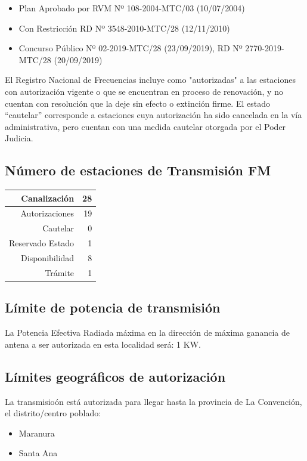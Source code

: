 \documentclass[11pt]{article}
\begin{document}
\begin{itemize}
	\item Plan Aprobado por RVM Nº 108-2004-MTC/03 (10/07/2004)
	\item Con Restricción RD Nº 3548-2010-MTC/28 (12/11/2010)
	\item Concurso Público Nº 02-2019-MTC/28 (23/09/2019), RD Nº 2770-2019-MTC/28 (20/09/2019)
\end{itemize}

El Registro Nacional de Frecuencias incluye como "autorizadas" a las estaciones con autorización vigente o que se encuentran en proceso de renovación, y no cuentan con resolución que la deje sin efecto o extinción firme. El estado “cautelar” corresponde a estaciones cuya autorización ha sido cancelada en la vía administrativa, pero cuentan con una medida cautelar otorgada por el Poder Judicia.

\subsection{Número de estaciones de Transmisión FM}

\begin{tabular}{|r|r|} \hline
	Canalización 			& 28 \\ \hline
	Autorizaciones			& 19 \\ \hline
	Cautelar				& 0 \\ \hline
	Reservado Estado		& 1 \\ \hline
	Disponibilidad			& 8 \\ \hline
	Trámite					& 1 \\ \hline 
\end{tabular}

\subsection{Límite de potencia de transmisión}

La Potencia Efectiva Radiada máxima en la dirección de máxima ganancia de antena a ser autorizada en esta localidad será: 1 KW.

\subsection{Límites geográficos de autorización}

La transmisioón está autorizada para llegar hasta la provincia de La Convención, el distrito/centro poblado:

\begin{itemize}
	\item Maranura
	\item Santa Ana
\end{itemize}
\end{document}

